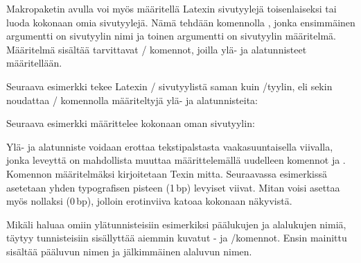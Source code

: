 \begin{koodilohkosis}
  \fancyhf[FC]{-- \thepage\ --}
\end{koodilohkosis}

Makropaketin  avulla voi myös määritellä Latexin
sivutyylejä toisenlaiseksi tai luoda kokonaan omia sivutyylejä. Nämä
tehdään komennolla , jonka ensimmäinen
argumentti on sivutyylin nimi ja toinen argumentti on sivutyylin
määritelmä. Määritelmä sisältää tarvittavat \-/
komennot, joilla ylä- ja alatunnisteet määritellään.

Seuraava esimerkki tekee Latexin \-/ sivutyylistä saman
kuin \-/tyylin, eli sekin noudattaa \-/
komennolla määriteltyjä ylä- ja alatunnisteita:

\begin{koodilohkosis}
\end{koodilohkosis}

Seuraava esimerkki määrittelee kokonaan oman sivutyylin:

\begin{koodilohkosis}
\end{koodilohkosis}

Ylä- ja alatunniste voidaan erottaa tekstipalstasta vaakasuuntaisella
viivalla, jonka leveyttä on mahdollista muuttaa määrittelemällä
uudelleen komennot  ja .
Komennon määritelmäksi kirjoitetaan Texin mitta. Seuraavassa esimerkissä
asetetaan yhden typografisen pisteen (1\,bp) levyiset viivat. Mitan
voisi asettaa myös nollaksi (0\,bp), jolloin erotinviiva katoaa kokonaan
näkyvistä.

\begin{koodilohkosis}
  \renewcommand{\headrulewidth}{1bp} %
  \renewcommand{\footrulewidth}{1bp} %
\end{koodilohkosis}

Mikäli haluaa omiin ylätunnisteisiin esimerkiksi päälukujen ja
alalukujen nimiä, täytyy tunnisteisiin sisällyttää aiemmin kuvatut
- ja \-/komennot. Ensin mainittu
sisältää pääluvun nimen ja jälkimmäinen alaluvun nimen.

